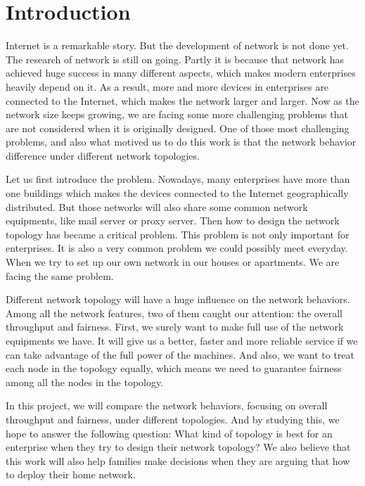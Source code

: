 \section{Introduction} \label{sec:introduction}

Internet is a remarkable story. But the development of network is not done yet. 
The research of network is still on going. 
Partly it is because that network has achieved huge success in many different aspects, 
which makes modern enterprises heavily depend on it. 
As a result, more and more devices in enterprises are connected to the Internet, 
which makes the network larger and larger. Now as the network size keeps growing, 
we are facing some more challenging problems that are not considered when it is originally designed. 
One of those most challenging problems, and also what motived us to do this work is 
that the network behavior difference under different network topologies.

Let us first introduce the problem. 
Nowadays, many enterprises have more than one buildings 
which makes the devices connected to the Internet geographically distributed. 
But those networks will also share some common network equipments, 
like mail server or proxy server. 
Then how to design the network topology has became a critical problem. 
This problem is not only important for enterprises. 
It is also a very common problem we could possibly meet everyday. 
When we try to set up our own network in our houses or apartments. 
We are facing the same problem.

Different network topology will have a huge influence on the network behaviors. 
Among all the network features, two of them caught our attention: 
the overall throughput and fairness. 
First, we surely want to make full use of the network equipments we have. 
It will give us a better, faster and more reliable service 
if we can take advantage of the full power of the machines. 
And also, we want to treat each node in the topology equally, 
which means we need to guarantee fairness among all the nodes in the topology.
 
In this project, we will compare the network behaviors, 
focusing on overall throughput and fairness, under different topologies. 
And by studying this, we hope to answer the following question: 
What kind of topology is best for an enterprise when they try to design their network topology? 
We also believe that this work will also help families make decisions 
when they are arguing that how to deploy their home network.


